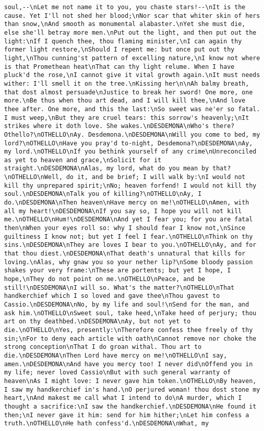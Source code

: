 \begin{verbatim}
soul,--\nLet me not name it to you, you chaste stars!--\nIt is the cause. Yet I'll not shed her blood;\nNor scar that whiter skin of hers than snow,\nAnd smooth as monumental alabaster.\nYet she must die, else she'll betray more men.\nPut out the light, and then put out the light:\nIf I quench thee, thou flaming minister,\nI can again thy former light restore,\nShould I repent me: but once put out thy light,\nThou cunning'st pattern of excelling nature,\nI know not where is that Promethean heat\nThat can thy light relume. When I have pluck'd the rose,\nI cannot give it vital growth again.\nIt must needs wither: I'll smell it on the tree.\nKissing her\n\nAh balmy breath, that dost almost persuade\nJustice to break her sword! One more, one more.\nBe thus when thou art dead, and I will kill thee,\nAnd love thee after. One more, and this the last:\nSo sweet was ne'er so fatal. I must weep,\nBut they are cruel tears: this sorrow's heavenly;\nIt strikes where it doth love. She wakes.\nDESDEMONA\nWho's there? Othello?\nOTHELLO\nAy. Desdemona.\nDESDEMONA\nWill you come to bed, my lord?\nOTHELLO\nHave you pray'd to-night, Desdemona?\nDESDEMONA\nAy, my lord.\nOTHELLO\nIf you bethink yourself of any crime\nUnreconciled as yet to heaven and grace,\nSolicit for it straight.\nDESDEMONA\nAlas, my lord, what do you mean by that?\nOTHELLO\nWell, do it, and be brief; I will walk by:\nI would not kill thy unprepared spirit;\nNo; heaven forfend! I would not kill thy soul.\nDESDEMONA\nTalk you of killing?\nOTHELLO\nAy, I do.\nDESDEMONA\nThen heaven\nHave mercy on me!\nOTHELLO\nAmen, with all my heart!\nDESDEMONA\nIf you say so, I hope you will not kill me.\nOTHELLO\nHum!\nDESDEMONA\nAnd yet I fear you; for you are fatal then\nWhen your eyes roll so: why I should fear I know not,\nSince guiltiness I know not; but yet I feel I fear.\nOTHELLO\nThink on thy sins.\nDESDEMONA\nThey are loves I bear to you.\nOTHELLO\nAy, and for that thou diest.\nDESDEMONA\nThat death's unnatural that kills for loving.\nAlas, why gnaw you so your nether lip?\nSome bloody passion shakes your very frame:\nThese are portents; but yet I hope, I hope,\nThey do not point on me.\nOTHELLO\nPeace, and be still!\nDESDEMONA\nI will so. What's the matter?\nOTHELLO\nThat handkerchief which I so loved and gave thee\nThou gavest to Cassio.\nDESDEMONA\nNo, by my life and soul!\nSend for the man, and ask him.\nOTHELLO\nSweet soul, take heed,\nTake heed of perjury; thou art on thy deathbed.\nDESDEMONA\nAy, but not yet to die.\nOTHELLO\nYes, presently:\nTherefore confess thee freely of thy sin;\nFor to deny each article with oath\nCannot remove nor choke the strong conception\nThat I do groan withal. Thou art to die.\nDESDEMONA\nThen Lord have mercy on me!\nOTHELLO\nI say, amen.\nDESDEMONA\nAnd have you mercy too! I never did\nOffend you in my life; never loved Cassio\nBut with such general warranty of heaven\nAs I might love: I never gave him token.\nOTHELLO\nBy heaven, I saw my handkerchief in's hand.\nO perjured woman! thou dost stone my heart,\nAnd makest me call what I intend to do\nA murder, which I thought a sacrifice:\nI saw the handkerchief.\nDESDEMONA\nHe found it then;\nI never gave it him: send for him hither;\nLet him confess a truth.\nOTHELLO\nHe hath confess'd.\nDESDEMONA\nWhat, my 
\end{verbatim}
